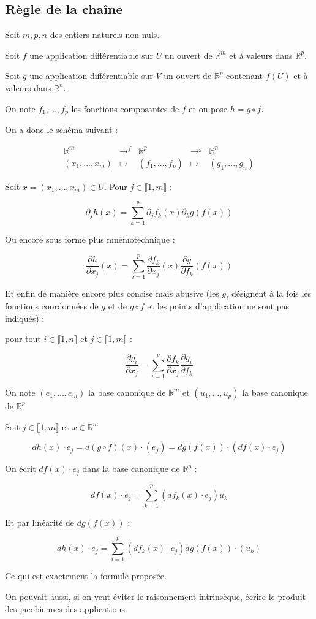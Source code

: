 \documentclass[a4paper,12pt]{book}
\newcommand{\Prop}[2]{\begin{tcolorbox}[sharp corners, colback=white,colframe=red!90!black!75, title=Proposition : #1]#2\end{tcolorbox}}
\newcommand{\Pre}[1]{\begin{tcolorbox}[sharp corners, colback=white,colframe=green!60!green!30!black!75, title=Preuve]#1\end{tcolorbox}}
\def\R{\mathbb{R}}
\begin{document}
\subsection{Règle de la chaîne}
\Prop{Règle de la châine}{Soit $m,p,n$ des entiers naturels non nuls.
\par Soit $f$ une application différentiable sur $U$ un ouvert de $\R^m$ et à valeurs dans $\R^p$.
\par Soit $g$ une application différentiable sur $V$ un ouvert de $\R^p$ contenant $f(U)$ et à valeurs dans $\R^n$.
\par On note $f_1,..., f_p$ les fonctions composantes de $f$ et on pose $h = g\circ f$.
\par On a donc le schéma suivant :
\par $$\begin{array}{ccccc} \R^m & \to^f & \R^p & \to^g & \R^n \\ (x_1,...,x_m) & \mapsto & (f_1,..., f_p) & \mapsto & (g_1,..., g_n)\end{array}$$
\par Soit $x=(x_1,..., x_m)\in U$. Pour $j\in \llbracket 1, m\rrbracket$ :
\par $$\partial_jh(x)=\sum\limits_{k=1}^p\partial_jf_k(x)\partial_kg(f(x))$$
\par Ou encore sous forme plus mnémotechnique :
\par $$\dfrac{\partial h}{\partial x_j}(x) =\sum\limits_{i=1}^p\dfrac{\partial f_k}{\partial x_j}(x)\dfrac{\partial g}{\partial f_k}(f(x))$$ 
\par Et enfin de manière encore plus concise mais abusive (les $g_i$ désignent à la fois les fonctions coordonnées de $g$ et de $g\circ f$ et les points d'application ne sont pas indiqués) :
\par pour tout $i\in\llbracket 1, n\rrbracket$ et $j\in\llbracket 1,m\rrbracket$ :
\par $$\dfrac{\partial g_i}{\partial x_j}=\sum\limits_{i=1}^p\dfrac{\partial f_k}{\partial x_j}\dfrac{\partial g_i}{\partial f_k}$$}
\Pre{On note $(e_1,..., e_m)$ la base canonique de $\R^m$ et $(u_1,..., u_p)$ la base canonique de $\R^p$
\par Soit $j\in\llbracket 1, m\rrbracket$ et $x\in\R^m$
\par $$dh(x)\cdot e_j = d(g\circ f)(x)\cdot (e_j) = dg(f(x))\cdot (df(x)\cdot e_j)$$
\par On écrit $df(x)\cdot e_j$ dans la base canonique de $\R^p$ :
\par $$df(x)\cdot e_j = \sum\limits_{k=1}^p(df_k(x)\cdot e_j)u_k$$
\par Et par linéarité de $dg(f(x))$ :
\par $$dh(x)\cdot e_j = \sum\limits_{i=1}^p(df_k(x)\cdot e_j)dg(f(x))\cdot(u_k)$$
\par Ce qui est exactement la formule proposée.
\par On pouvait aussi, si on veut éviter le raisonnement intrinsèque, écrire le produit des jacobiennes des applications.}
\end{document}
